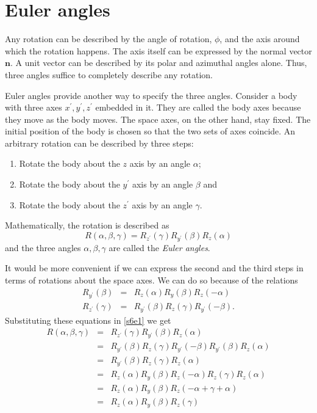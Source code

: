 \documentclass{article}
\numberwithin{equation}{section}
\let\vec\bm
\theoremstyle{plain}
\numberwithin{thm}{section}
\theoremstyle{plain}
\numberwithin{prop}{section}
\theoremstyle{definition}
\numberwithin{defn}{section}
\theoremstyle{remark}
\begin{document}
\section{Euler angles}\label{s6}
Any rotation can be described by the angle of rotation, $\phi$, and the axis
around which the rotation happens. The axis itself can be expressed by the
normal vector $\vec{n}$. A unit vector can be described by its polar and
azimuthal angles alone. Thus, three angles suffice to completely describe any
rotation.

Euler angles provide another way to specify the three angles. Consider a body
with three axes $x^\prime, y^\prime, z^\prime$ embedded in it. They are called
the body axes because they move as the body moves. The space axes, on the other
hand, stay fixed. The initial position of the body is chosen so that the two
sets of axes coincide. An arbitrary rotation can be described by three steps:
\begin{enumerate}
\item Rotate the body about the $z$ axis by an angle $\alpha$;
\item Rotate the body about the $y^\prime$ axis by an angle $\beta$ and
\item Rotate the body about the $z^\prime$ axis by an angle $\gamma$.
\end{enumerate}
Mathematically, the rotation is described as
\begin{equation}\label{s6e1}
R(\alpha, \beta, \gamma) = R_{z^\prime}(\gamma)R_{y^\prime}(\beta)R_z(\alpha)
\end{equation}
and the three angles $\alpha, \beta, \gamma$ are called the \emph{Euler angles}.

It would be more convenient if we can express the second and the third steps
in terms of rotations about the space axes. We can do so because of the 
relations
\begin{eqnarray}
R_{y^\prime}(\beta) &=& R_z(\alpha)R_y(\beta)R_z(-\alpha) \label{s6e2}\\
R_{z^\prime}(\gamma) &=& R_{y^\prime}(\beta)R_z(\gamma)R_{y^\prime}(-\beta).
\label{s6e3}
\end{eqnarray}
Substituting these equations in \eqref{s6e1} we get
\begin{eqnarray}
R(\alpha, \beta, \gamma) &=& R_{z^\prime}(\gamma)R_{y^\prime}(\beta)R_z(\alpha)
\nonumber \\
 &=& R_{y^\prime}(\beta)R_z(\gamma)R_{y^\prime}(-\beta)
     R_{y^\prime}(\beta)R_z(\alpha) \nonumber \\
 &=& R_{y^\prime}(\beta)R_z(\gamma)R_z(\alpha) \nonumber \\
 &=& R_z(\alpha)R_y(\beta)R_z(-\alpha)R_z(\gamma)R_z(\alpha) \nonumber \\
 &=& R_z(\alpha)R_y(\beta)R_z(-\alpha + \gamma + \alpha) \nonumber \\
 &=& R_z(\alpha)R_y(\beta)R_z(\gamma) \label{s6e4}
\end{eqnarray}
\end{document}
